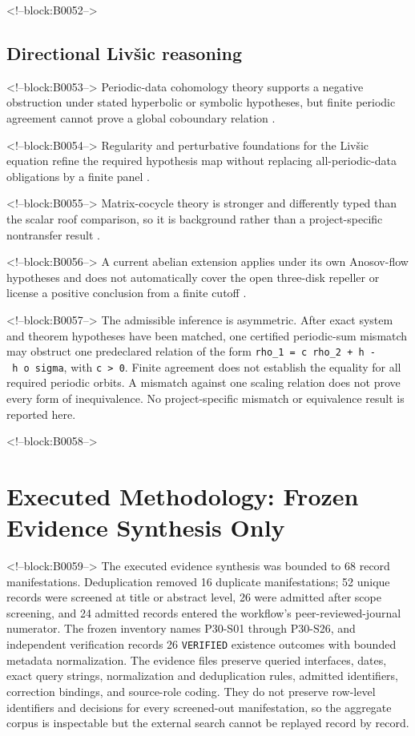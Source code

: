 \documentclass[11pt,a4paper]{article}
\begin{document}
<!--block:B0052-->
\subsection{Directional Livšic reasoning}

<!--block:B0053-->
Periodic-data cohomology theory supports a negative obstruction under stated hyperbolic or symbolic hypotheses, but finite periodic agreement cannot prove a global coboundary relation
\citep{P30-S23}.

<!--block:B0054-->
Regularity and perturbative foundations for the Livšic equation refine the required hypothesis map without replacing all-periodic-data obligations by a finite panel
\citep{P30-S24}.

<!--block:B0055-->
Matrix-cocycle theory is stronger and differently typed than the scalar roof comparison, so it is background rather than a project-specific nontransfer result
\citep{P30-S25}.

<!--block:B0056-->
A current abelian extension applies under its own Anosov-flow hypotheses and does not automatically cover the open three-disk repeller or license a positive conclusion from a finite cutoff
\citep{P30-S26}.

<!--block:B0057-->
The admissible inference is asymmetric. After exact system and theorem hypotheses have been matched, one certified periodic-sum mismatch may obstruct one predeclared relation of the form \texttt{rho\_1\ =\ c\ rho\_2\ +\ h\ -\ h\ o\ sigma}, with \texttt{c\ \textgreater{}\ 0}. Finite agreement does not establish the equality for all required periodic orbits. A mismatch against one scaling relation does not prove every form of inequivalence. No project-specific mismatch or equivalence result is reported here.

<!--block:B0058-->
\section{Executed Methodology: Frozen Evidence Synthesis Only}

<!--block:B0059-->
The executed evidence synthesis was bounded to 68 record manifestations. Deduplication removed 16 duplicate manifestations; 52 unique records were screened at title or abstract level, 26 were admitted after scope screening, and 24 admitted records entered the workflow's peer-reviewed-journal numerator. The frozen inventory names P30-S01 through P30-S26, and independent verification records 26 \texttt{VERIFIED} existence outcomes with bounded metadata normalization. The evidence files preserve queried interfaces, dates, exact query strings, normalization and deduplication rules, admitted identifiers, correction bindings, and source-role coding. They do not preserve row-level identifiers and decisions for every screened-out manifestation, so the aggregate corpus is inspectable but the external search cannot be replayed record by record.
\end{document}
